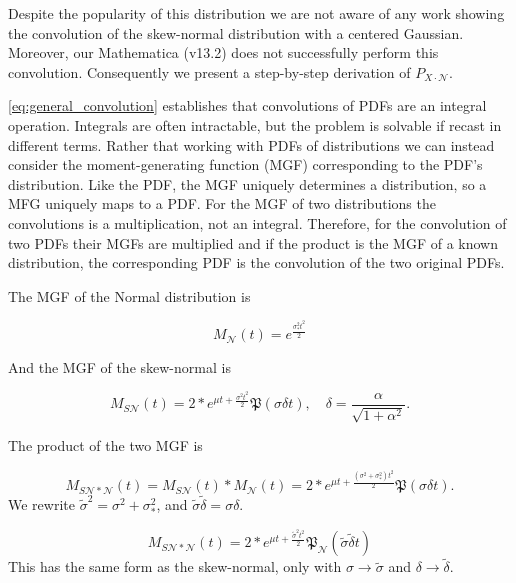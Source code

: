 \documentclass[twocolumn]{aastex631}
\newcommand{\mfk}[1]{\mathfrak{#1}}
\newcommand{\mcal}[1]{\mathcal{#1}}
\newcommand{\Exp}[1]{e^{#1}}
\newcommand{\cdf}{\mfk{P}}
\begin{document}
        Despite the popularity of this distribution we are not aware of any work showing the convolution of the skew-normal distribution with a centered Gaussian. Moreover, our Mathematica (v13.2) does not successfully perform this convolution. Consequently we present a step-by-step derivation of $P_{X\cdot\mcal{N}}$.

        \autoref{eq:general_convolution} establishes that convolutions of PDFs are an integral operation. Integrals are often intractable, but the problem is solvable if recast in different terms. Rather that working with PDFs of distributions we can instead consider the moment-generating function (MGF) corresponding to the PDF's distribution. Like the PDF, the MGF uniquely determines a distribution, so a MFG uniquely maps to a PDF. For the MGF of two distributions the convolutions is a multiplication, not an integral.
        Therefore, for the convolution of two PDFs their MGFs are multiplied and if the product is the MGF of a known distribution, the corresponding PDF is the convolution of the two original PDFs.

        The MGF of the Normal distribution is

        \begin{equation} \label{eq:mgf_normal}
            M_{\mcal{N}}(t) = \Exp{\frac{\sigma_*^2 t^2}{2}}
        \end{equation}

        And the MGF of the skew-normal is

        \begin{equation} \label{eq:mgf_skewnormal}
            M_{S\mcal{N}}(t) = 2 * \Exp{\mu t + \frac{\sigma^2 t^2}{2}} \cdf(\sigma \delta t), \quad \delta = \frac{\alpha}{\sqrt{1 + \alpha^2}}.
        \end{equation}

        The product of the two MGF is

        \begin{equation}
            M_{S\mcal{N}*\mcal{N}}(t) = M_{S\mcal{N}}(t) * M_{\mcal{N}}(t) = 2 * \Exp{\mu t + \frac{(\sigma^2 + \sigma_*^2) t^2}{2}} \cdf(\sigma \delta t).
        \end{equation}
        We rewrite $\tilde\sigma^2 = \sigma^2 + \sigma_*^2$, and $\tilde{\sigma} \tilde{\delta} = \sigma \delta$.

        \begin{equation}
            M_{S\mcal{N}*\mcal{N}}(t) = 2 * \Exp{\mu t + \frac{\tilde{\sigma}^2 t^2}{2}} \cdf_{\mcal{N}}(\tilde{\sigma} \tilde{\delta} t)
        \end{equation}
        This has the same form as the skew-normal, only with $\sigma \rightarrow \tilde\sigma$ and $\delta \rightarrow \tilde\delta$.
\end{document}
